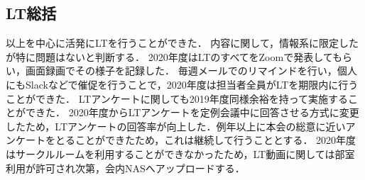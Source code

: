 \subsection*{LT総括}


\secondGrade{}以上を中心に活発にLTを行うことができた．
内容に関して，情報系に限定したが特に問題はないと判断する．
2020年度はLTのすべてをZoomで発表してもらい，画面録画でその様子を記録した．
毎週メールでのリマインドを行い，個人にもSlackなどで催促を行うことで，2020年度は担当者全員がLTを期限内に行うことができた．
LTアンケートに関しても2019年度同様余裕を持って実施することができた．
2020年度からLTアンケートを定例会議中に回答させる方式に変更したため，LTアンケートの回答率が向上した．例年以上に本会の総意に近いアンケートをとることができたため，これは継続して行うこととする．
2020年度はサークルルームを利用することができなかったため，LT動画に関しては部室利用が許可され次第，会内NASへアップロードする．
